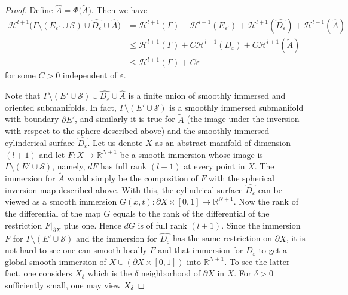 \documentclass{amsart}
\numberwithin{equation}{section}
\theoremstyle{definition}
\theoremstyle{remark}
\newcommand{\R}{\mathbb{R}}
\begin{document}
\begin{proof}
{Define $\widehat{A} =\Phi\big(\widetilde{A}\big)$. Then we have 
\begin{align*}\mathcal{H}^{l+1}\big(\Gamma \setminus (E_{\varepsilon'} \cup \mathcal{S}) \cup \widehat{D_\varepsilon} \cup \widehat{A}\big) 
&= \mathcal{H}^{l+1}(\Gamma) - \mathcal{H}^{l+1}(E_{\varepsilon'}) + \mathcal{H}^{l+1}(\widehat{D_\varepsilon}) 
+ \mathcal{H}^{l+1}(\widehat{A})\\
&\le \mathcal{H}^{l+1}(\Gamma) + C\mathcal{H}^{l+1}({D_\varepsilon}) 
+ C\mathcal{H}^{l+1}(\widetilde{A})\\
& \leq \mathcal{H}^{l+1}(\Gamma) + C \varepsilon
\end{align*}}
for some $C>0$ independent of $\varepsilon$.

Note that $\Gamma \setminus (E' \cup \mathcal{S}) \cup {\widehat{D_{\varepsilon}}
\cup \widehat{A}}$ is a finite union of smoothly immersed and oriented submanifolds.
In fact, $\Gamma \setminus (E'\cup \mathcal{S})$ is a smoothly immersed submanifold with boundary $\partial E'$, and
similarly it is true for $ \widetilde{A}$ (the image under the inversion with respect to the sphere described above) and the smoothly immersed cylinderical
surface {$\widehat{D_\varepsilon}$}. Let us denote $X$ as  an abstract manifold {of dimension $(l+1)$} and let $F : X\to \R^{N+1}$ be a smooth immersion
{whose image is} $\Gamma \setminus (E'\cup \mathcal{S})$,
namely, $dF$ has full rank {$(l+1)$} at every point in $X$. The immersion for $ \widetilde{A}$ would simply be the composition of $F$ 
{with the spherical} inversion map {described above}. With this,
the cylindrical surface {$\widehat{D_\varepsilon}$} can be viewed as a smooth immersion $G(x,t): \partial X \times [0,1]\to {\R^{N+1}}$.
Now  the rank of the differential of the map $G$  equals to  the rank of the differential of  the restriction $F\big|_{\partial X}$ plus one. Hence  $dG$ is  of full rank $(l+1)$.
Since the immersion $F$ {for $\Gamma\setminus (E'\cup\mathcal{S})$ and the immersion for $\widehat{D_\varepsilon}$} has the same restriction on $\partial X$, it is not hard to see one can smooth locally $F$ and that immersion for {$D_\varepsilon$ to get} a global smooth immersion of $X\cup(\partial X \times [0,1])$ into
 {$\R^{N+1}$}.  To see the latter fact, one considers $X_{\delta}$ which is the $\delta$ neighborhood of $\partial X$ in $X$. For $\delta>0$ sufficiently small,  one may view $X_{\delta}$ 

\end{proof}
\end{document}
